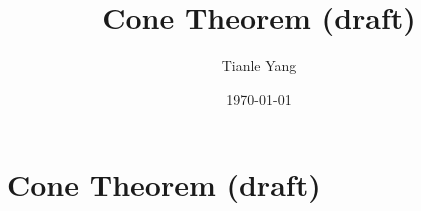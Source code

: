 \documentclass{noteformyself}
\title{Cone Theorem (draft)}
\author{Tianle Yang}
\date{\today}
\begin{document}
    \maketitle

    \section{Cone Theorem (draft)}


    \printbibliography[heading=bibintoc]
\end{document}
